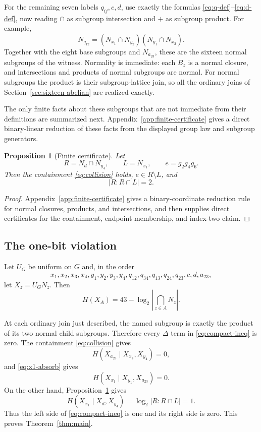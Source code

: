 \documentclass[journal]{IEEEtran}
\newtheorem{proposition}[theorem]{Proposition}
\begin{document}
For the remaining seven labels $q_{ij},c,d$, use exactly the formulas
\eqref{eq:q-def}--\eqref{eq:d-def}, now reading $\cap$ as subgroup intersection
and $+$ as subgroup product.  For example,
\[
 N_{q_{12}}=(N_{x_1}\cap N_{y_2})(N_{y_1}\cap N_{x_2}).
\]
Together with the eight base subgroups and $N_{a_{23}}$, these are the sixteen
normal subgroups of the witness.  Normality is immediate: each $B_z$ is a
normal closure, and intersections and products of normal subgroups are normal.
For normal subgroups the product is their subgroup-lattice join, so all the
ordinary joins of Section~\ref{sec:sixteen-abelian} are realized exactly.

The only finite facts about these subgroups that are not immediate from their
definitions are summarized next.  Appendix~\ref{app:finite-certificate} gives
a direct binary-linear reduction of these facts from the displayed group law
and subgroup generators.

\begin{proposition}[Finite certificate]\label{prop:certificate}
Let
\[
 R=N_d\cap N_{y_4},\qquad L=N_{x_1},\qquad e=g_2g_4g_6.
\]
Then the containment \eqref{eq:collision} holds,
$e\in R\setminus L$, and
\[
   |R:R\cap L|=2.
\]
\end{proposition}

\begin{proof}
Appendix~\ref{app:finite-certificate} gives a binary-coordinate reduction rule
for normal closures, products, and intersections, and then supplies direct
certificates for the containment, endpoint membership, and index-two claim.
\end{proof}

\subsection{The one-bit violation}
Let $U_G$ be uniform on $G$ and, in the order
\[
 x_1,x_2,x_3,x_4,y_1,y_2,y_3,y_4,
 q_{12},q_{34},q_{13},q_{24},q_{23},c,d,a_{23},
\]
let $X_z=U_GN_z$.  Then
\begin{equation}\label{eq:witness-entropy}
 H(X_A)=43-\log_2\left|\bigcap_{z\in A}N_z\right|.
\end{equation}

At each ordinary join just described, the named subgroup is exactly the
product of its two normal child subgroups.  Therefore every
$\Delta$ term in \eqref{eq:compact-ineq} is zero.  The containment
\eqref{eq:collision} gives
\[
 H(X_{a_{23}}\mid X_{x_4},X_{y_4})=0,
\]
and \eqref{eq:x1-absorb} gives
\[
 H(X_{x_1}\mid X_{y_1},X_{a_{23}})=0.
\]
On the other hand, Proposition~\ref{prop:certificate} gives
\[
 H(X_{x_1}\mid X_d,X_{y_4})=\log_2|R:R\cap L|=1.
\]
Thus the left side of \eqref{eq:compact-ineq} is one and its right side is
zero.  This proves Theorem~\ref{thm:main}.
\end{document}
